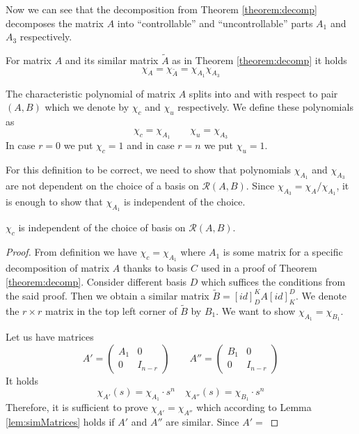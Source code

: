 Now we can see that the decomposition from Theorem \ref{theorem:decomp} decomposes the matrix $A$ into ``controllable'' and ``uncontrollable'' parts $A_1$ and $A_3$ respectively.

\begin{cor}
	For matrix $A$ and its similar matrix $\widetilde{A}$ as in Theorem \ref{theorem:decomp} it holds $$\chi_A=\chi_{\widetilde{A}}=\chi_{A_1}\chi_{A_3}$$
\end{cor} 

\begin{definition}
	The characteristic polynomial of matrix $A$ splits into  and  with respect to pair $(A,B)$ which we denote by $\chi_c$ and $\chi_u$ respectively. We define these polynomials as $$\chi_c=\chi_{A_1} \qquad \chi_u=\chi_{A_3}$$ In case $r=0$ we put $\chi_c=1$ and in case $r=n$ we put $\chi_u=1$.
\end{definition}

For this definition to be correct, we need to show that polynomials $\chi_{A_1}$ and $\chi_{A_3}$ are not dependent on the choice of a basis on $\mathcal{R}(A,B)$. Since $\chi_{A_3}=\chi_A/\chi_{A_1}$, it is enough to show that $\chi_{A_1}$ is independent of the choice.

\begin{lemma}
	$\chi_c$ is independent of the choice of basis on $\mathcal{R}(A,B)$.
\end{lemma}

\begin{proof}
	From definition we have $\chi_c=\chi_{A_1}$ where $A_1$ is some matrix for a specific decomposition of matrix $A$ thanks to basis $C$ used in a proof of Theorem \ref{theorem:decomp}. Consider different basis $D$ which suffices the conditions from the said proof. Then we obtain a similar matrix $\widetilde{B}=[id]^K_DA[id]^D_K$. We denote the $r \times r$ matrix in the top left corner of $\widetilde{B}$ by $B_1$. We want to show $\chi_{A_1}=\chi_{B_1}$.
	
	Let us have matrices
	\begin{equation*}
		A'=
		\begin{pmatrix}
			A_1 & 0 \\
			0   & I_{n-r}
		\end{pmatrix}
		\qquad
		A''=
		\begin{pmatrix}
			B_1 & 0 \\
			0   & I_{n-r}
		\end{pmatrix}
	\end{equation*}
	It holds $$\chi_{A'}(s)=\chi_{A_1}\cdot s^n \quad \chi_{A''}(s)=\chi_{B_1}\cdot s^n$$
	Therefore, it is sufficient to prove $\chi_{A'}=\chi_{A''}$ which according to Lemma \ref{lem:simMatrices} holds if $A'$ and $A''$ are similar. Since $A'=$  
\end{proof}